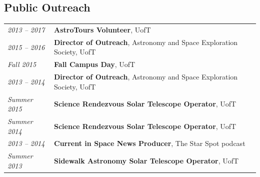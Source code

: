 \documentclass[10pt]{res} %
\begin{document}
\begin{resume}

\section{\Large Public Outreach}
\vspace{-5pt} %
\noindent\makebox[\linewidth]{\rule{\textwidth}{0.4pt}}
\vspace{-20pt} %

\begin{table}[h!]
\begin{tabularx}{\textwidth}{lX}
\textit{2013 -- 2017} & \textbf{AstroTours Volunteer}, UofT \\
\textit{2015 -- 2016} & \textbf{Director of Outreach}, Astronomy and Space Exploration Society, UofT \\
\textit{Fall 2015} & \textbf{Fall Campus Day}, UofT \\
\textit{2013 -- 2014} & \textbf{Director of Outreach}, Astronomy and Space Exploration Society, UofT \\
\textit{Summer 2015} & \textbf{Science Rendezvous Solar Telescope Operator}, UofT \\
\textit{Summer 2014} & \textbf{Science Rendezvous Solar Telescope Operator}, UofT \\
\textit{2013 -- 2014} & \textbf{Current in Space News Producer}, The Star Spot podcast \\
\textit{Summer 2013} & \textbf{Sidewalk Astronomy Solar Telescope Operator}, UofT
\end{tabularx}
\end{table}



\end{resume} 
\end{document}
